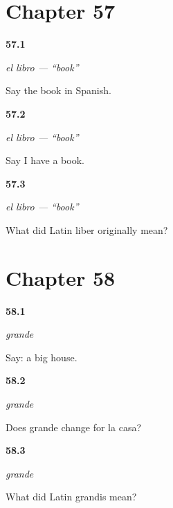\section*{Chapter 57}

\noindent\begin{minipage}[t]{\linewidth}
\raggedright
\hypertarget{review-ES-C43-libro-article}{\textbf{57.1}} \emph{el libro — \textquotedblleft{}book\textquotedblright{}}\par
\small Say the book in Spanish.
\end{minipage}\par\medskip

\noindent\begin{minipage}[t]{\linewidth}
\raggedright
\hypertarget{review-ES-C43-libro-have}{\textbf{57.2}} \emph{el libro — \textquotedblleft{}book\textquotedblright{}}\par
\small Say I have a book.
\end{minipage}\par\medskip

\noindent\begin{minipage}[t]{\linewidth}
\raggedright
\hypertarget{review-ES-C43-libro-bark}{\textbf{57.3}} \emph{el libro — \textquotedblleft{}book\textquotedblright{}}\par
\small What did Latin liber originally mean?
\end{minipage}\par\medskip

\section*{Chapter 58}

\noindent\begin{minipage}[t]{\linewidth}
\raggedright
\hypertarget{review-ES-C09-grande-order}{\textbf{58.1}} \emph{grande}\par
\small Say: a big house.
\end{minipage}\par\medskip

\noindent\begin{minipage}[t]{\linewidth}
\raggedright
\hypertarget{review-ES-C09-grande-invariant}{\textbf{58.2}} \emph{grande}\par
\small Does grande change for la casa?
\end{minipage}\par\medskip

\noindent\begin{minipage}[t]{\linewidth}
\raggedright
\hypertarget{review-ES-C09-grande-cousin}{\textbf{58.3}} \emph{grande}\par
\small What did Latin grandis mean?
\end{minipage}\par\medskip

